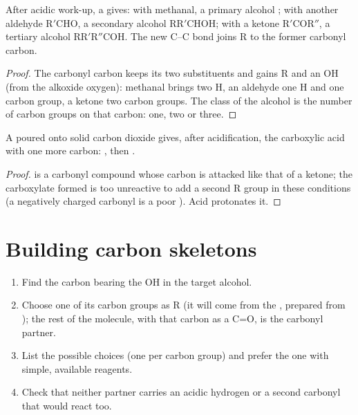 \begin{proposition}\label{prop:b1:organomagnesium:carbonyl-addition}
After acidic work-up, a   gives: with methanal, a
primary alcohol ; with another aldehyde $\mathrm{R'CHO}$, a secondary
alcohol $\mathrm{RR'CHOH}$; with a ketone $\mathrm{R'COR''}$, a tertiary alcohol
$\mathrm{RR'R''COH}$. The new C--C bond joins R to the former carbonyl carbon.
\end{proposition}

\begin{proof}
The carbonyl carbon keeps its two substituents and gains R and an OH
(from the alkoxide oxygen): methanal brings two H, an aldehyde one H and
one carbon group, a ketone two carbon groups. The class of the alcohol is
the number of carbon groups on that carbon: one, two or three.
\end{proof}

\begin{proposition}\label{prop:b1:organomagnesium:co2}
A  poured onto solid carbon dioxide gives, after
acidification, the carboxylic acid  with one more carbon:
, then .
\end{proposition}

\begin{proof}
 is a carbonyl compound whose carbon is attacked like that of a
ketone; the carboxylate formed is too unreactive to add a second R group
in these conditions (a negatively charged carbonyl is a poor
). Acid protonates it.
\end{proof}

\section{Building carbon skeletons}

\begin{method}\label{met:b1:organomagnesium:plan-alcohol}
\begin{enumerate}
  \item Find the carbon bearing the OH in the target alcohol.
  \item Choose one of its carbon groups as R (it will come from the
        , prepared from ); the rest of the
        molecule, with that carbon as a C=O, is the carbonyl partner.
  \item List the possible choices (one per carbon group) and prefer the
        one with simple, available reagents.
  \item Check that neither partner carries an acidic hydrogen or a second
        carbonyl that would react too.
\end{enumerate}
\end{method}

